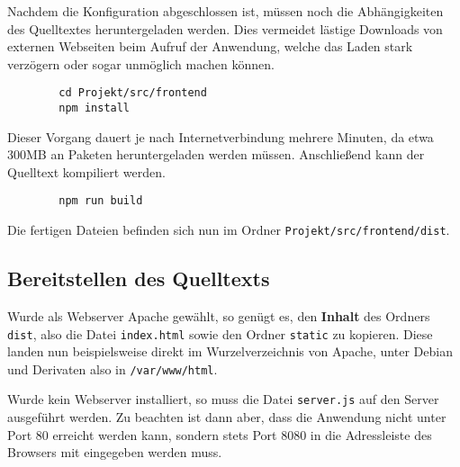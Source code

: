 \documentclass[a4paper,11pt,oneside, titlepage]{article}
\begin{document}
      Nachdem die Konfiguration abgeschlossen ist, müssen noch die Abhängigkeiten des Quelltextes heruntergeladen werden.
      Dies vermeidet lästige Downloads von externen Webseiten beim Aufruf der Anwendung, welche das Laden stark verzögern
      oder sogar unmöglich machen können.

      \begin{lstlisting}
        cd Projekt/src/frontend
        npm install \end{lstlisting}

      Dieser Vorgang dauert je nach Internetverbindung mehrere Minuten, da etwa 300MB an Paketen heruntergeladen werden müssen.
      Anschließend kann der Quelltext kompiliert werden.

      \begin{lstlisting}
        npm run build \end{lstlisting}

      Die fertigen Dateien befinden sich nun im Ordner \verb+Projekt/src/frontend/dist+.

    \subsection{Bereitstellen des Quelltexts}

      Wurde als Webserver Apache gewählt, so genügt es, den \textbf{Inhalt} des Ordners \verb+dist+, also
      die Datei \verb+index.html+ sowie den Ordner \verb+static+ zu kopieren. Diese landen nun
      beispielsweise direkt im Wurzelverzeichnis von Apache, unter Debian und Derivaten also in \verb+/var/www/html+.

      Wurde kein Webserver installiert, so muss die Datei \verb+server.js+ auf den Server ausgeführt werden. Zu beachten ist 
      dann aber, dass die Anwendung nicht unter Port 80 erreicht werden kann, sondern stets Port 8080 in die 
      Adressleiste des Browsers mit eingegeben werden muss.
\end{document}
